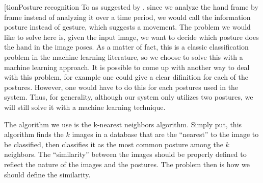 \sec[tion{Posture recognition}
To as suggested by \cite{orientation}, since we analyze the hand frame by frame instead of analyzing it over a time period, we would call the information  posture instead of gesture, which suggests a movement. The problem we would like to solve here is, given the input image, we want to decide which posture does the hand in the image poses. As a matter of fact, this is a classic classification problem in the machine learning literature, so we choose to solve this with a machine learning approach. It is possible to come up with another way to deal with this problem, for example one could give a clear difinition for each of the postures. However, one would have to do this for each postures used in the system. Thus, for generality, although our system only utilizes two postures, we will still solve it with a machine learning technique. 

The algorithm we use is the k-nearest neighbors algorithm. Simply put, this algorithm finds the $k$ images in a database that are the ``nearest'' to the image to be classified, then classifies it as the most common posture among the $k$ neighbors. The ``similarity'' between the images should be properly defined to reflect the nature of the images and the postures. The problem then is how we should define the similarity. 

